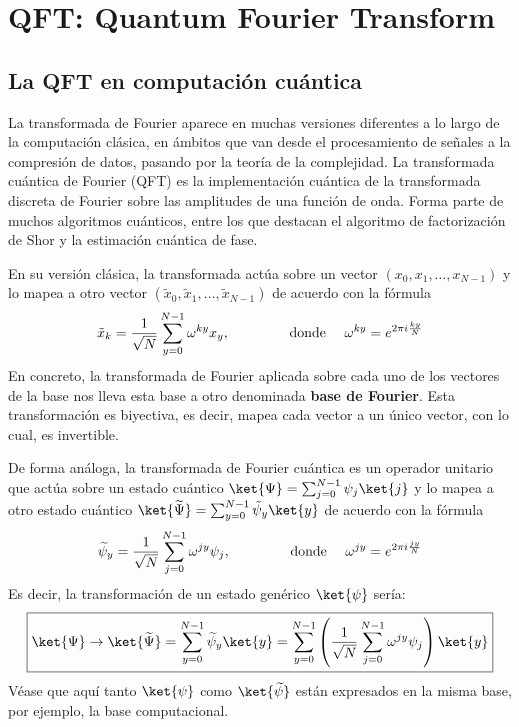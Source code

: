 \documentclass[a4paper,11pt]{book} %
\numberwithin{equation}{chapter}
\def\lp{\left(}
\def\rp{\right)}
\begin{document}
	



\chapter{QFT: Quantum Fourier Transform} \label{sec_chapter_QFT}

	\section{La QFT en computación cuántica}
	
La transformada de Fourier aparece en muchas versiones diferentes a lo largo de la computación clásica, en ámbitos que van desde el procesamiento de señales a la compresión de datos, pasando por la teoría de la complejidad. La transformada cuántica de Fourier (QFT) es la implementación cuántica de la transformada discreta de Fourier sobre las amplitudes de una función de onda. Forma parte de muchos algoritmos cuánticos, entre los que destacan el algoritmo de factorización de Shor y la estimación cuántica de fase.

En su versión clásica, la transformada actúa sobre un vector $(x_0, x_1, \dots, x_{N-1})$ y lo mapea a otro vector $(\tilde{x}_0, \tilde{x}_1, \dots, \tilde{x}_{N-1})$ de acuerdo con la fórmula
	\begin{equation} \label{ec_QFT_clasica}
	\tilde{x}_k = \frac{1}{\sqrt{N}} \sum_{y=0}^{N-1} \omega^{ky} x_y, \hspace{1.5cm} \text{donde } \quad \omega^{ky}= e^{2\pi i \frac{ky}{N}}
	\end{equation}
 En concreto, la transformada de Fourier aplicada sobre cada uno de los vectores de la base nos lleva esta base a otro denominada \textbf{base de Fourier}. Esta transformación es biyectiva, es decir, mapea cada vector a un único vector, con lo cual, es invertible.

De forma análoga, la transformada de Fourier cuántica es un operador unitario que actúa sobre un estado cuántico $ \ket{\Psi} = \sum_{j=0}^{N-1} \psi_j \ket{j}$ y lo mapea a otro estado cuántico $\ket{\widetilde{\Psi}} = \sum_{y=0}^{N-1} \tilde{\psi}_y \ket{y}$ de acuerdo con la fórmula
	\begin{equation}
	\widetilde{\psi}_y = \frac{1}{\sqrt{N}} \sum_{j=0}^{N-1} \omega^{jy} \psi_j, \hspace{1.5cm} \text{donde } \quad \omega^{jy} = e^{2\pi i \frac{jy}{N}}
	\end{equation}
Es decir, la transformación de un estado genérico $\ket{\psi}$ sería:
	\begin{equation} \label{ec_QFT_sobre_Psi}
	\boxed{\ket{\Psi} \to \ket{\widetilde{\Psi}} = \sum_{y=0}^{N-1} \widetilde{\psi}_y \ket{y} =  \sum_{y=0}^{N-1} \lp \frac{1}{\sqrt{N}} \sum_{j=0}^{N-1} \omega^{jy} \psi_j \rp \ket{y}}
	\end{equation}	
Véase que aquí tanto $\ket{\psi}$ como $\ket{\widetilde{\psi}}$ están expresados en la misma base, por ejemplo, la base computacional.
\end{document}
